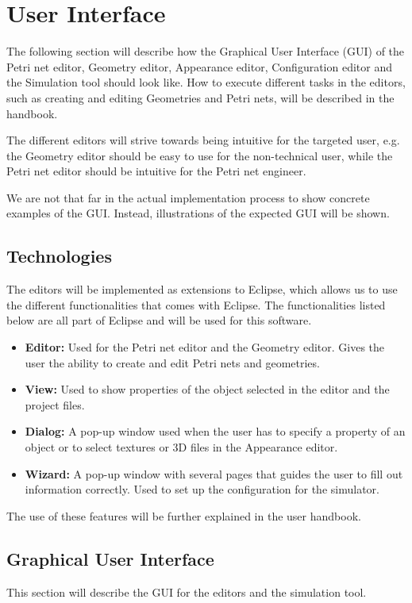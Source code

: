 \section{User Interface}
\label{sec:user-interface}

The following section will describe how the Graphical User Interface (GUI) of the Petri net editor, Geometry editor, Appearance editor, Configuration editor and the Simulation tool should look like. How to execute different tasks in the editors, such as creating and editing Geometries and Petri nets, will be described in the handbook. 

The different editors will strive towards being intuitive for the targeted user, e.g. the Geometry editor should be easy to use for the non-technical user, while the Petri net editor should be intuitive for the Petri net engineer.
 
We are not that far in the actual implementation process to show concrete examples of the GUI. Instead, illustrations of the expected GUI will be shown. 

\subsection{Technologies}
The editors will be implemented as extensions to Eclipse, which allows us to use the different functionalities that comes with Eclipse. The functionalities listed below are all part of Eclipse and will be used for this software.

\begin{itemize}
\item{\textbf{Editor:} Used for the Petri net editor and the Geometry editor. Gives the user the ability to create and edit Petri nets and geometries.}
\item{\textbf{View:} Used to show properties of the object selected in the editor and the project files.}
\item{\textbf{Dialog:} A pop-up window used when the user has to specify a property of an object or to select textures or 3D files in the Appearance editor.}
\item{\textbf{Wizard:} A pop-up window with several pages that guides the user to fill out information correctly. Used to set up the configuration for the simulator.}
\end{itemize}

The use of these features will be further explained in the user handbook. 

\subsection{Graphical User Interface}
This section will describe the GUI for the editors and the simulation tool. 

